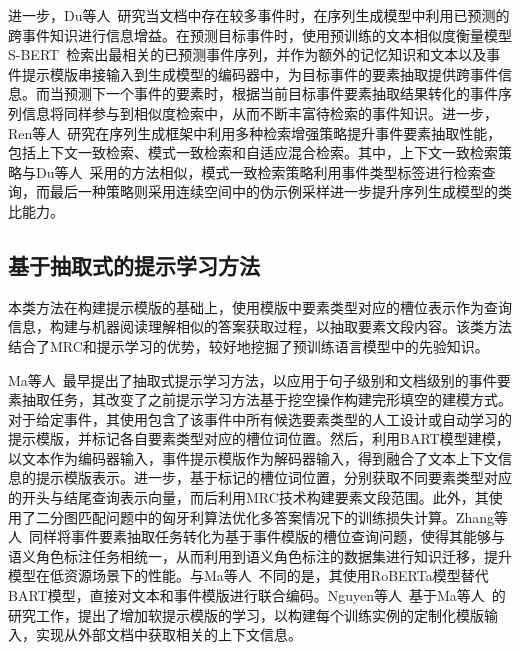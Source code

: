 进一步，Du等人~\cite{du2022dynamic}研究当文档中存在较多事件时，在序列生成模型中利用已预测的跨事件知识进行信息增益。在预测目标事件时，使用预训练的文本相似度衡量模型S-BERT~\cite{reimers2019sentence}检索出最相关的已预测事件序列，并作为额外的记忆知识和文本以及事件提示模版串接输入到生成模型的编码器中，为目标事件的要素抽取提供跨事件信息。而当预测下一个事件的要素时，根据当前目标事件要素抽取结果转化的事件序列信息将同样参与到相似度检索中，从而不断丰富待检索的事件知识。进一步，Ren等人~\cite{ren2023retrieve}研究在序列生成框架中利用多种检索增强策略提升事件要素抽取性能，包括上下文一致检索、模式一致检索和自适应混合检索。其中，上下文一致检索策略与Du等人~\cite{du2022dynamic}采用的方法相似，模式一致检索策略利用事件类型标签进行检索查询，而最后一种策略则采用连续空间中的伪示例采样进一步提升序列生成模型的类比能力。


\subsection{基于抽取式的提示学习方法}

本类方法在构建提示模版的基础上，使用模版中要素类型对应的槽位表示作为查询信息，构建与机器阅读理解相似的答案获取过程，以抽取要素文段内容。该类方法结合了MRC和提示学习的优势，较好地挖掘了预训练语言模型中的先验知识。

Ma等人~\cite{ma2022prompt}最早提出了抽取式提示学习方法，以应用于句子级别和文档级别的事件要素抽取任务，其改变了之前提示学习方法基于挖空操作构建完形填空的建模方式。对于给定事件，其使用包含了该事件中所有候选要素类型的人工设计或自动学习的提示模版，并标记各自要素类型对应的槽位词位置。然后，利用BART模型建模，
以文本作为编码器输入，事件提示模版作为解码器输入，得到融合了文本上下文信息的提示模版表示。进一步，基于标记的槽位词位置，分别获取不同要素类型对应的开头与结尾查询表示向量，而后利用MRC技术构建要素文段范围。此外，其使用了二分图匹配问题中的匈牙利算法优化多答案情况下的训练损失计算。Zhang等人~\cite{zhang2022transfer}同样将事件要素抽取任务转化为基于事件模版的槽位查询问题，使得其能够与语义角色标注任务相统一，从而利用到语义角色标注的数据集进行知识迁移，提升模型在低资源场景下的性能。与Ma等人~\cite{ma2022prompt}不同的是，其使用RoBERTa模型替代BART模型，直接对文本和事件模版进行联合编码。Nguyen等人~\cite{nguyen2023contextualized}基于Ma等人~\cite{ma2022prompt}的研究工作，提出了增加软提示模版的学习，以构建每个训练实例的定制化模版输入，实现从外部文档中获取相关的上下文信息。


